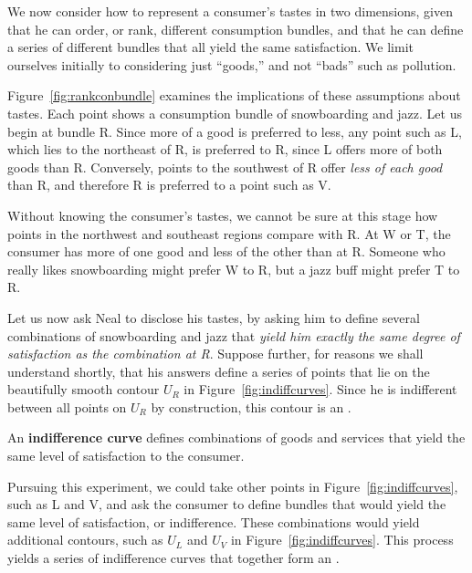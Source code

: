 We now consider how to represent a consumer's tastes in two dimensions, given that he can order, or rank, different consumption bundles, and that he can define a series of different bundles that all yield the same satisfaction. We limit ourselves initially to considering just ``goods,'' and not ``bads'' such as pollution.

Figure~\ref{fig:rankconbundle} examines the implications of these assumptions about tastes. Each point shows a consumption bundle of snowboarding and jazz. Let us begin at bundle R. Since more of a good is preferred to less, any point such as L, which lies to the northeast of R, is preferred to R, since L offers more of both goods than R. Conversely, points to the southwest of R offer \textit{less of each good} than R, and therefore R is preferred to a point such as V.



Without knowing the consumer's tastes, we cannot be sure at this stage how points in the northwest and southeast regions compare with R. At W or T, the consumer has more of one good and less of the other than at R. Someone who really likes snowboarding might prefer W to R, but a jazz buff might prefer T to R.

Let us now ask Neal to disclose his tastes, by asking him to define several combinations of snowboarding and jazz that \textit{yield him exactly the same degree of satisfaction as the combination at R}. Suppose further, for reasons we shall understand shortly, that his answers define a series of points that lie on the beautifully smooth contour $U_R$ in Figure~\ref{fig:indiffcurves}. Since he is indifferent between all points on $U_R$ by construction, this contour is an .



\begin{DefBox}
An \textbf{indifference curve} defines combinations of goods and services that yield the same level of satisfaction to the consumer.
\end{DefBox}

Pursuing this experiment, we could take other points in Figure~\ref{fig:indiffcurves}, such as L and V, and ask the consumer to define bundles that would yield the same level of satisfaction, or indifference. These combinations would yield additional contours, such as $U_L$ and $U_V$ in Figure~\ref{fig:indiffcurves}. This process yields a series of indifference curves that together form an .

